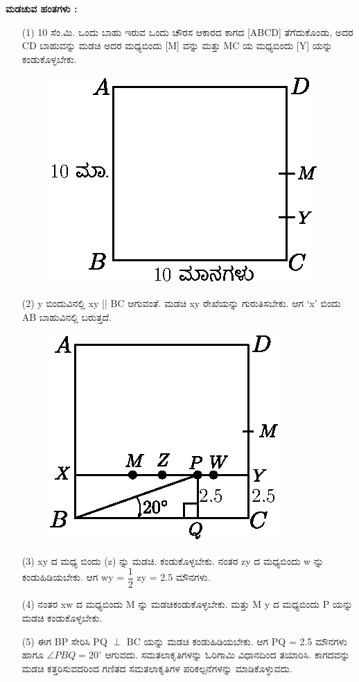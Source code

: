 \medskip
\noindent
\textbf{ಮಡಚುವ ಹಂತಗಳು :}
\begin{enumerate}
\item[(1)] 10 ಸೆಂ.ಮಿ. ಒಂದು ಬಾಹು ಇರುವ ಒಂದು ಚೌರಸ ಆಕಾರದ ಕಾಗದ  [ABCD] ತೆಗೆದುಕೊಂಡು, ಅದರ CD ಬಾಹುವನ್ನು ಮಡಚಿ ಅದರ ಮಧ್ಯಬಿಂದು [M] ವನ್ನು ಮತ್ತು MC ಯ ಮಧ್ಯಬಿಂದು [Y] ಯನ್ನು ಕಂಡುಕೊಳ್ಳಬೇಕು. 
\begin{figure}[H]
\centering
\includegraphics[scale=.98]{src/figure/chap1/fig1-14a.eps}
\end{figure}

\item[(2)] y ಬಿಂದುವಿನಲ್ಲಿ  xy || BC ಆಗುವಂತೆ. ಮಡಚಿ xy ರೇಖೆಯನ್ನು ಗುರುತಿಸಬೇಕು. ಆಗ `x' ಬಿಂದು AB ಬಾಹುವಿನಲ್ಲಿ ಬರುತ್ತದೆ. 
\begin{figure}[H]
\centering
\includegraphics[scale=.98]{src/figure/chap1/fig1-14b.eps}
\end{figure}

\item[(3)] xy ದ ಮಧ್ಯ ಬಿಂದು (z) ನ್ನು ಮಡಚಿ. ಕಂಡುಕೊಳ್ಳಬೇಕು. ನಂತರ zy ದ ಮಧ್ಯಬಿಂದು w ನ್ನು ಕಂಡುಹಿಡಿಯಬೇಕು. ಆಗ wy = $\dfrac{1}{2}$ zy = 2.5 ಮೌನಗಳು. 

\item[(4)] ನಂತರ xw ದ ಮಧ್ಯಬಿಂದು M ನ್ನು ಮಡಚಿಕಂಡುಕೊಳ್ಳಬೇಕು. ಮತ್ತು M y ದ ಮಧ್ಯಬಿಂದು  P ಯನ್ನು ಮಡಚಿ ಕಂಡುಕೊಳ್ಳಬೇಕು.

\item[(5)] ಈಗ BP ಸೇರಿಸಿ PQ $\perp$ BC ಯನ್ನು ಮಡಚಿ ಕಂಡುಹಿಡಿಯಬೇಕು. ಆಗ PQ = 2.5 ಮೌನಗಳು ಹಾಗೂ  $\angle PBQ = 20^\circ$ ಆಗುವದು.  
ಸಮತಲಾಕೃತಿಗಳನ್ನು ಓರಿಗಾಮಿ ವಿಧಾನದಿಂದ ತಯಾರಿಸಿ. ಕಾಗದವನ್ನು ಮಡಚಿ ಕತ್ತರಿಸುವದರಿಂದ ಗಣಿತದ ಸಮತಲಾಕೃತಿಗಳ ಪರಿಕಲ್ಪನೆಗಳನ್ನು ಮಾಡಿಕೊಳ್ಳುವದು. 
\end{enumerate}

